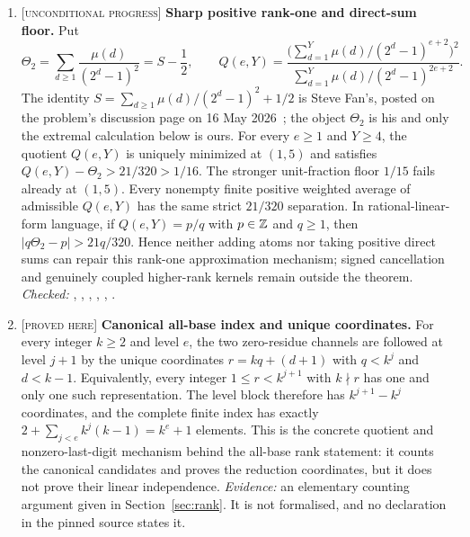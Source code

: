 \documentclass[11pt]{article}
\newcommand{\Stot}{S}
\newcommand{\stag}[1]{{\normalfont\footnotesize\textsc{[#1]}}}
\begin{document}
{\begin{enumerate}[label=\textbf{R\arabic*.},ref=R\arabic*,leftmargin=2.4em,
  itemsep=0.2em,topsep=0.25em]
\item\label{res:rankonefloor} \stag{unconditional progress}
\textbf{Sharp positive rank-one and direct-sum floor.}  Put
\[
 \Theta_2=\sum_{d\ge1}\frac{\mu(d)}{(2^d-1)^2}=\Stot-\frac12,
 \qquad
 Q(e,Y)=
 \frac{\bigl(\sum_{d=1}^{Y}\mu(d)/(2^d-1)^{e+2}\bigr)^2}
      {\sum_{d=1}^{Y}\mu(d)/(2^d-1)^{2e+2}}.
\]
The identity $\Stot=\sum_{d\ge1}\mu(d)/(2^d-1)^2+1/2$ is Steve Fan's, posted on
the problem's discussion page on 16 May 2026~\cite{fan2026totient}; the object
$\Theta_2$ is his and only the extremal calculation below is ours.
For every $e\ge1$ and $Y\ge4$, the quotient $Q(e,Y)$ is uniquely minimized
at $(1,5)$ and satisfies $Q(e,Y)-\Theta_2>21/320>1/16$.  The stronger
unit-fraction floor $1/15$ fails already at $(1,5)$.  Every nonempty finite
positive weighted average of admissible $Q(e,Y)$ has the same strict
$21/320$ separation.  In rational-linear-form language, if
$Q(e,Y)=p/q$ with $p\in\mathbb{Z}$ and $q\ge1$, then
$|q\Theta_2-p|>21q/320$.  Hence neither adding atoms nor taking positive direct
sums can repair this rank-one approximation mechanism; signed cancellation
and genuinely coupled higher-rank kernels remain outside the theorem.
{\footnotesize\emph{Checked:}
,
,
,
,
,
.}

\item\label{res:index} \stag{proved here}
\textbf{Canonical all-base index and unique coordinates.}  For every integer
$k\ge2$ and level $e$, the two zero-residue channels are followed at level
$j+1$ by the unique coordinates
$r=kq+(d+1)$ with $q<k^j$ and $d<k-1$.  Equivalently, every integer
$1\le r<k^{j+1}$ with $k\nmid r$ has one and only one such representation.
The level block therefore has $k^{j+1}-k^j$ coordinates, and the complete
finite index has exactly
$2+\sum_{j<e}k^j(k-1)=k^e+1$ elements.  This is the concrete quotient and
nonzero-last-digit mechanism behind the all-base rank statement: it counts
the canonical candidates and proves the reduction coordinates, but it does
not prove their linear independence.
{\footnotesize\emph{Evidence:} an elementary counting argument given in
Section~\ref{sec:rank}.  It is not formalised, and no declaration in the
pinned source states it.}


\end{enumerate}}
\end{document}
